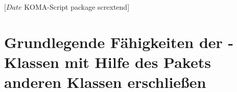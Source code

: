 %
%
%
%
%
%
%
%
% 
%
%
%
%

                 [$Date$
                  KOMA-Script package scrextend]

\chapter[tocentry={Grundlegende Fähigkeiten der
  \KOMAScript-Klassen\protect\linebreak
  mit Hilfe des Pakets \Package{scrextend} anderen Klassen erschließen},
  head={Fähigkeiten von \KOMAScript-Klassen mit \Package{scrextend}}]
{Grundlegende Fähigkeiten der \KOMAScript-Klassen mit Hilfe des Pakets
   anderen Klassen erschließen}
\BeginIndexGroup
{}%

